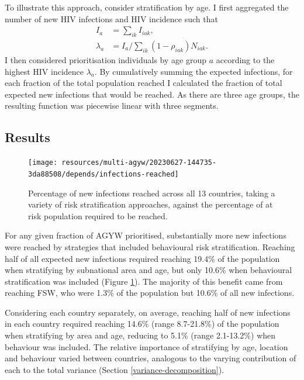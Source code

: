 \documentclass[a4paper, nobind]{templates/ociamthesis}
\begin{document}
To illustrate this approach, consider stratification by age.
I first aggregated the number of new HIV infections and HIV incidence such that
\begin{align}
    I_a &= \sum_{ik} I_{iak}, \\
    \lambda_a &= I_a / \sum_{ik} (1 - \rho_{iak}) N_{iak}.
\end{align}
I then considered prioritisation individuals by age group \(a\) according to the highest HIV incidence \(\lambda_a\).
By cumulatively summing the expected infections, for each fraction of the total population reached I calculated the fraction of total expected new infections that would be reached.
As there are three age groups, the resulting function was piecewise linear with three segments.

\hypertarget{results-1}{%
\subsection{Results}\label{results-1}}



\begin{figure}
\texttt{[image: resources/multi-agyw/20230627-144735-3da88508/depends/infections-reached]} \caption{Percentage of new infections reached across all 13 countries, taking a variety of risk stratification approaches, against the percentage of at risk population required to be reached.}\label{fig:infections-reached}
\end{figure}

For any given fraction of AGYW prioritised, substantially more new infections were reached by strategies that included behavioural risk stratification.
Reaching half of all expected new infections required reaching 19.4\% of the population when stratifying by subnational area and age, but only 10.6\% when behavioural stratification was included (Figure \ref{fig:infections-reached}).
The majority of this benefit came from reaching FSW, who were 1.3\% of the population but 10.6\% of all new infections.

Considering each country separately, on average, reaching half of new infections in each country required reaching 14.6\% (range 8.7-21.8\%) of the population when stratifying by area and age, reducing to 5.1\% (range 2.1-13.2\%) when behaviour was included.
The relative importance of stratifying by age, location and behaviour varied between countries, analogous to the varying contribution of each to the total variance (Section \ref{variance-decomposition}).
\end{document}
